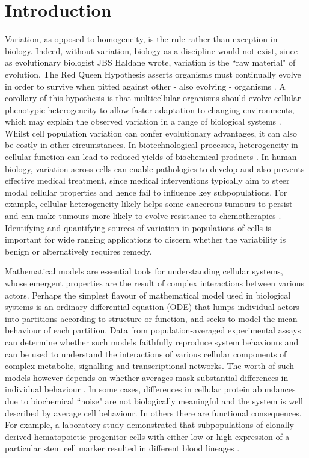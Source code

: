 \section{Introduction}
Variation, as opposed to homogeneity, is the rule rather than exception in biology. Indeed, without variation, biology as a discipline would not exist, since as evolutionary biologist JBS Haldane wrote, variation is the ``raw material" of evolution. The Red Queen Hypothesis asserts organisms must continually evolve in order to survive when pitted against other - also evolving - organisms \cite{ridley1994red}. A corollary of this hypothesis is that multicellular organisms should evolve cellular phenotypic heterogeneity to allow faster adaptation to changing environments, which may explain the observed variation in a range of biological systems \cite{fraser2009chance}. Whilst cell population variation can confer evolutionary advantages, it can also be costly in other circumstances. In biotechnological processes, heterogeneity in cellular function can lead to reduced yields of biochemical products \cite{delvigne2014metabolic}. In human biology, variation across cells can enable pathologies to develop and also prevents effective medical treatment, since medical interventions typically aim to steer modal cellular properties and hence fail to influence key subpopulations. For example, cellular heterogeneity likely helps some cancerous tumours to persist \cite{gatenby2007cellular} and can make tumours more likely to evolve resistance to chemotherapies \cite{altrock2015mathematics}. Identifying and quantifying sources of variation in populations of cells is important for wide ranging applications to discern whether the variability is benign or alternatively requires remedy.

Mathematical models are essential tools for understanding cellular systems, whose emergent properties are the result of complex interactions between various actors. Perhaps the simplest flavour of mathematical model used in biological systems is an ordinary differential equation (ODE) that lumps individual actors into partitions according to structure or function, and seeks to model the mean behaviour of each partition. Data from population-averaged experimental assays can determine whether such models faithfully reproduce system behaviours and can be used to understand the interactions of various cellular components of complex metabolic, signalling and transcriptional networks. The worth of such models however depends on whether averages mask substantial differences in individual behaviour \cite{altschuler2010cellular}. In some cases, differences in cellular protein abundances due to biochemical ``noise" are not biologically meaningful  \cite{elowitz2002stochastic} and the system is well described by average cell behaviour. In others there are functional consequences. For example, a laboratory study demonstrated that subpopulations of clonally-derived hematopoietic progenitor cells with either low or high expression of a particular stem cell marker resulted in different blood lineages \cite{chang2008transcriptome}.

